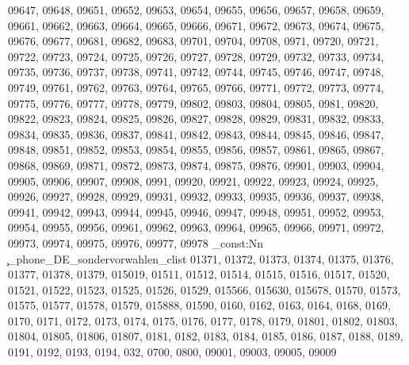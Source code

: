 {09647,
09648,
09651,
09652,
09653,
09654,
09655,
09656,
09657,
09658,
09659,
09661,
09662,
09663,
09664,
09665,
09666,
09671,
09672,
09673,
09674,
09675,
09676,
09677,
09681,
09682,
09683,
09701,
09704,
09708,
0971,
09720,
09721,
09722,
09723,
09724,
09725,
09726,
09727,
09728,
09729,
09732,
09733,
09734,
09735,
09736,
09737,
09738,
09741,
09742,
09744,
09745,
09746,
09747,
09748,
09749,
09761,
09762,
09763,
09764,
09765,
09766,
09771,
09772,
09773,
09774,
09775,
09776,
09777,
09778,
09779,
09802,
09803,
09804,
09805,
0981,
09820,
09822,
09823,
09824,
09825,
09826,
09827,
09828,
09829,
09831,
09832,
09833,
09834,
09835,
09836,
09837,
09841,
09842,
09843,
09844,
09845,
09846,
09847,
09848,
09851,
09852,
09853,
09854,
09855,
09856,
09857,
09861,
09865,
09867,
09868,
09869,
09871,
09872,
09873,
09874,
09875,
09876,
09901,
09903,
09904,
09905,
09906,
09907,
09908,
0991,
09920,
09921,
09922,
09923,
09924,
09925,
09926,
09927,
09928,
09929,
09931,
09932,
09933,
09935,
09936,
09937,
09938,
09941,
09942,
09943,
09944,
09945,
09946,
09947,
09948,
09951,
09952,
09953,
09954,
09955,
09956,
09961,
09962,
09963,
09964,
09965,
09966,
09971,
09972,
09973,
09974,
09975,
09976,
09977,
09978}
\clist_const:Nn \c_phone_DE_sondervorwahlen_clist {01371,
01372,
01373,
01374,
01375,
01376,
01377,
01378,
01379,
015019,
01511,
01512,
01514,
01515,
01516,
01517,
01520,
01521,
01522,
01523,
01525,
01526,
01529,
015566,
015630,
015678,
01570,
01573,
01575,
01577,
01578,
01579,
015888,
01590,
0160,
0162,
0163,
0164,
0168,
0169,
0170,
0171,
0172,
0173,
0174,
0175,
0176,
0177,
0178,
0179,
01801,
01802,
01803,
01804,
01805,
01806,
01807,
0181,
0182,
0183,
0184,
0185,
0186,
0187,
0188,
0189,
0191,
0192,
0193,
0194,
032,
0700,
0800,
09001,
09003,
09005,
09009}
